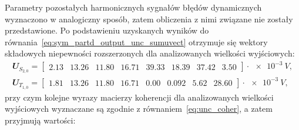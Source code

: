 Parametry pozostałych harmonicznych sygnałów błędów dynamicznych wyznaczono w analogiczny sposób, zatem obliczenia z nimi związane nie zostały przedstawione. Po podstawieniu uzyskanych wyników do równania~\eqref{eq:sym_partd_output_unc_sumuvect} otrzymuje się wektory składowych niepewności rozszerzonych dla analizowanych wielkości wyjściowych:
\begin{gather}
\mathbfit{U}_{S_{2,0}} =
\begin{bmatrix}
\num{2.13} & \num{13.26} & \num{11.80} & \num{16.71} & \num{39.33} & \num{18.39} & \num{37.42} & \num{3.50}
\end{bmatrix} \cdot \qty{e-3}{V}
\label{eq:sym_partd_output_unc_sumuvect_S_2_0_b}, \\
\mathbfit{U}_{T_{1,0}} =
\begin{bmatrix}
\num{1.81} & \num{13.26} & \num{11.80} & \num{16.71} & \num{0.00} & \num{0.092} & \num{5.62} & \num{28.60}
\end{bmatrix} \cdot \qty{e-3}{V}
\label{eq:sym_partd_output_unc_sumuvect_T_1_0_b},
\end{gather}
przy czym kolejne wyrazy macierzy koherencji dla analizowanych wielkości wyjściowych wyznaczane są zgodnie z równaniem~\eqref{eq:unc_coher}, a zatem przyjmują wartości:
